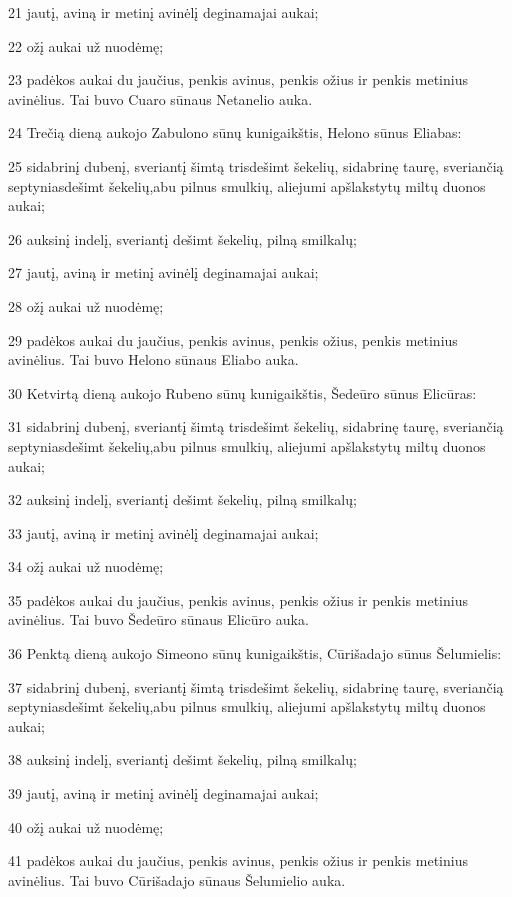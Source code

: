 \par 21 jautį, aviną ir metinį avinėlį deginamajai aukai; 
\par 22 ožį aukai už nuodėmę; 
\par 23 padėkos aukai du jaučius, penkis avinus, penkis ožius ir penkis metinius avinėlius. Tai buvo Cuaro sūnaus Netanelio auka. 
\par 24 Trečią dieną aukojo Zabulono sūnų kunigaikštis, Helono sūnus Eliabas: 
\par 25 sidabrinį dubenį, sveriantį šimtą trisdešimt šekelių, sidabrinę taurę, sveriančią septyniasdešimt šekelių,­abu pilnus smulkių, aliejumi apšlakstytų miltų duonos aukai; 
\par 26 auksinį indelį, sveriantį dešimt šekelių, pilną smilkalų; 
\par 27 jautį, aviną ir metinį avinėlį deginamajai aukai; 
\par 28 ožį aukai už nuodėmę; 
\par 29 padėkos aukai du jaučius, penkis avinus, penkis ožius, penkis metinius avinėlius. Tai buvo Helono sūnaus Eliabo auka. 
\par 30 Ketvirtą dieną aukojo Rubeno sūnų kunigaikštis, Šedeūro sūnus Elicūras: 
\par 31 sidabrinį dubenį, sveriantį šimtą trisdešimt šekelių, sidabrinę taurę, sveriančią septyniasdešimt šekelių,­abu pilnus smulkių, aliejumi apšlakstytų miltų duonos aukai; 
\par 32 auksinį indelį, sveriantį dešimt šekelių, pilną smilkalų; 
\par 33 jautį, aviną ir metinį avinėlį deginamajai aukai; 
\par 34 ožį aukai už nuodėmę; 
\par 35 padėkos aukai du jaučius, penkis avinus, penkis ožius ir penkis metinius avinėlius. Tai buvo Šedeūro sūnaus Elicūro auka. 
\par 36 Penktą dieną aukojo Simeono sūnų kunigaikštis, Cūrišadajo sūnus Šelumielis: 
\par 37 sidabrinį dubenį, sveriantį šimtą trisdešimt šekelių, sidabrinę taurę, sveriančią septyniasdešimt šekelių,­abu pilnus smulkių, aliejumi apšlakstytų miltų duonos aukai; 
\par 38 auksinį indelį, sveriantį dešimt šekelių, pilną smilkalų; 
\par 39 jautį, aviną ir metinį avinėlį deginamajai aukai; 
\par 40 ožį aukai už nuodėmę; 
\par 41 padėkos aukai du jaučius, penkis avinus, penkis ožius ir penkis metinius avinėlius. Tai buvo Cūrišadajo sūnaus Šelumielio auka. 
